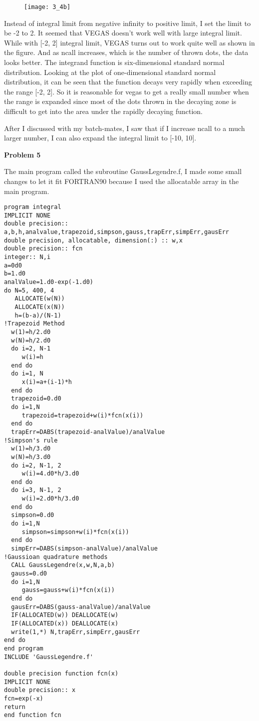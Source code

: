 \documentclass{article}
\begin{document}
\begin{figure} [ht]
\texttt{[image: 3\_4b]}
\end{figure}

Instead of integral limit from negative infinity to positive limit, I set the limit to be -2 to 2.   It seemed that VEGAS doesn't work well with large integral limit.  While with [-2, 2] integral limit, VEGAS turns out to work quite well as shown in the figure.  And as ncall increases, which is the number of thrown dots, the data looks better.   The integrand function is six-dimensional standard normal distribution.  Looking at the plot of one-dimensional standard normal distribution, it can be seen that the function decays very rapidly when exceeding the range [-2, 2].  So it is reasonable for vegas to get a really small number when the range is expanded since most of the dots thrown in the decaying zone is difficult to get into the area under the rapidly decaying function.


After I discussed with my batch-mates, I saw that if I increase ncall to a much larger number, I can also expand the integral limit to [-10, 10].
\vskip 1cm


\textbf{Problem 5}

The main program called the subroutine GaussLegendre.f, I made some small changes to let it fit FORTRAN90 because I used the allocatable array in the main program.
  
\begin{verbatim}
program integral
IMPLICIT NONE
double precision:: a,b,h,analvalue,trapezoid,simpson,gauss,trapErr,simpErr,gausErr 
double precision, allocatable, dimension(:) :: w,x
double precision:: fcn
integer:: N,i
a=0d0
b=1.d0
analValue=1.d0-exp(-1.d0)
do N=5, 400, 4
   ALLOCATE(w(N))
   ALLOCATE(x(N))
   h=(b-a)/(N-1)
!Trapezoid Method
  w(1)=h/2.d0
  w(N)=h/2.d0
  do i=2, N-1
     w(i)=h
  end do
  do i=1, N
     x(i)=a+(i-1)*h
  end do
  trapezoid=0.d0
  do i=1,N
     trapezoid=trapezoid+w(i)*fcn(x(i))
  end do
  trapErr=DABS(trapezoid-analValue)/analValue
!Simpson's rule
  w(1)=h/3.d0
  w(N)=h/3.d0
  do i=2, N-1, 2
     w(i)=4.d0*h/3.d0
  end do
  do i=3, N-1, 2
     w(i)=2.d0*h/3.d0
  end do
  simpson=0.d0
  do i=1,N
     simpson=simpson+w(i)*fcn(x(i))
  end do
  simpErr=DABS(simpson-analValue)/analValue
!Gaussioan quadrature methods
  CALL GaussLegendre(x,w,N,a,b)
  gauss=0.d0
  do i=1,N
     gauss=gauss+w(i)*fcn(x(i))
  end do
  gausErr=DABS(gauss-analValue)/analValue
  IF(ALLOCATED(w)) DEALLOCATE(w)
  IF(ALLOCATED(x)) DEALLOCATE(x)
  write(1,*) N,trapErr,simpErr,gausErr
end do
end program 
INCLUDE 'GaussLegendre.f'

double precision function fcn(x)
IMPLICIT NONE
double precision:: x
fcn=exp(-x)
return
end function fcn
\end{verbatim}
\end{document}
